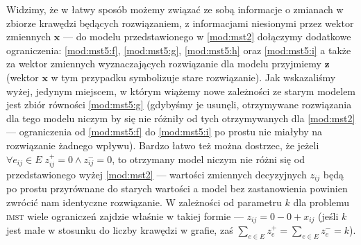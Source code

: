 Widzimy, że w łatwy sposób możemy związać ze sobą informacje o zmianach w zbiorze krawędzi będących rozwiązaniem, z informacjami niesionymi przez wektor zmiennych $\textbf{x}$ --- do modelu przedstawionego w \ref{mod:mst2} dołączymy dodatkowe ograniczenia: \ref{mod:mst5:f}, \ref{mod:mst5:g}, \ref{mod:mst5:h} oraz \ref{mod:mst5:i} a także za wektor zmiennych wyznaczających rozwiązanie dla modelu przyjmiemy $\textbf{z}$ (wektor $\textbf{x}$ w tym przypadku symbolizuje stare rozwiązanie). Jak wskazaliśmy wyżej, jedynym miejscem, w którym wiążemy nowe zależności ze starym modelem jest zbiór równości \ref{mod:mst5:g} (gdybyśmy je usunęli, otrzymywane rozwiązania dla tego modelu niczym by się nie różniły od tych otrzymywanych dla \ref{mod:mst2} --- ograniczenia od \ref{mod:mst5:f} do \ref{mod:mst5:i} po prostu nie miałyby na rozwiązanie żadnego wpływu). Bardzo łatwo też można dostrzec, że jeżeli $\forall e_{ij} \in E \; z_{ij}^{+} = 0 \wedge z_{ij}^{-} = 0$, to otrzymany model niczym nie różni się od przedstawionego wyżej \ref{mod:mst2} --- wartości zmiennych decyzyjnych $z_{ij}$ będą po prostu przyrównane do starych wartości a model bez zastanowienia powinien zwrócić nam identyczne rozwiązanie. W zależności od parametru $k$ dla problemu \textsc{imst} wiele ograniczeń zajdzie właśnie w takiej formie --- $z_{ij} = 0 - 0 + x_{ij}$ (jeśli $k$ jest małe w stosunku do liczby krawędzi w grafie, zaś $\sum_{e \in E} z_{e}^{+} = \sum_{e \in E} z_{e}^{-} = k$).

